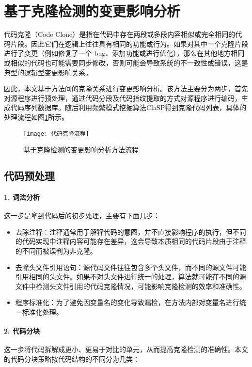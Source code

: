 \section{基于克隆检测的变更影响分析}
代码克隆（Code Clone）是指在代码中存在两段或多段内容相似或完全相同的代码片段。因此它们在逻辑上往往具有相同的功能或行为。如果对其中一个克隆片段进行了变更（例如修复了一个 bug、添加功能或进行优化），那么在其他地方相同或相似的代码也可能需要同步修改，否则可能会导致系统的不一致性或错误，这是典型的逻辑型变更影响关系。

因此，本文基于方法间的克隆关系进行变更影响分析。该方法主要分为两步，首先对源程序进行预处理，通过代码分段及代码指纹提取的方式对源程序进行编码，生成代码序列数据库。随后利用频繁模式挖掘算法ClaSP得到克隆代码列表，具体的处理流程如图\ref{1_基于代码克隆的变更影响分析方法流程}所示。

\begin{figure}[htbp]
\centering
\texttt{[image: 代码克隆流程]}
\caption{基于克隆检测的变更影响分析方法流程}
\label{1_基于代码克隆的变更影响分析方法流程}
\end{figure}

\subsection{代码预处理}

\paragraph{1. 词法分析} 这一步是拿到代码后的初步处理，主要有下面几步：

\begin{itemize}
    \item 去除注释：注释通常用于解释代码的意图，并不直接影响程序的执行，但不同的代码实现中注释内容可能存在差异，这会导致本质相同的代码片段由于注释的不同而被误判为非克隆。
    
    \item 去除头文件引用语句：源代码文件往往包含多个头文件，而不同的源文件可能引用相同的头文件。如果不对头文件进行统一的处理，算法就可能在不同的源文件中检测头文件引用的代码克隆情况，可能影响克隆检测的效率和准确性。
    
    \item 程序标准化：为了避免因变量名的变化导致漏检，在方法内部对变量名进行统一标准化处理。

\end{itemize}


\paragraph{2. 代码分块} 这一步将代码拆解成更小、更易于对比的单元，从而提高克隆检测的准确性。本文的代码分块策略按代码结构的不同分为几类：

